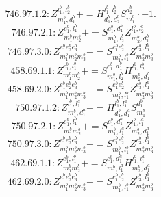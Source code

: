 \documentclass[letterpaper,10pt,fleqn,leqno,onecolumn]{article}
\begin{document}
\begin{equation} \;\;\;\;\;\;  746.97.1.2: Z^{l_{1}^{b},l_{2}^{b}}_{m_{1}^{b},d_{1}^{b}}+=H^{l_{1}^{b},l_{2}^{b}}_{d_{1}^{b},d_{2}^{b}}S^{d_{2}^{b}}_{m_{1}^{b}}\cdot -1. \end{equation}
\begin{equation} \;\;\;\;\;\;  746.97.2.1: Z^{e_{1}^{b},l_{1}^{b}}_{m_{1}^{b}m_{2}^{b}}+=S^{e_{1}^{b},d_{1}^{b}}_{m_{1}^{b},l_{2}^{b}}Z^{l_{1}^{b},l_{2}^{b}}_{m_{2}^{b},d_{1}^{b}} \end{equation}
\begin{equation} \;\;\;\;\;\;  746.97.3.0: Z^{e_{1}^{b}e_{2}^{b}e_{3}^{b}}_{m_{1}^{b}m_{2}^{b}m_{3}^{b}}+=S^{e_{1}^{b}e_{2}^{b}}_{m_{1}^{b},l_{1}^{b}}Z^{e_{3}^{b},l_{1}^{b}}_{m_{2}^{b}m_{3}^{b}} \end{equation}
\begin{equation} \;\;\;\;\;\;  458.69.1.1: Z^{e_{1}^{b},l_{1}^{b}}_{m_{1}^{b}m_{2}^{b}}+=S^{e_{1}^{b},d_{1}^{b}}_{m_{1}^{b},l_{2}^{b}}H^{l_{1}^{b},l_{2}^{b}}_{m_{2}^{b},d_{1}^{b}} \end{equation}
\begin{equation} \;\;\;\;\;\;  458.69.2.0: Z^{e_{1}^{b}e_{2}^{b}e_{3}^{b}}_{m_{1}^{b}m_{2}^{b}m_{3}^{b}}+=S^{e_{1}^{b}e_{2}^{b}}_{m_{1}^{b},l_{1}^{b}}Z^{e_{3}^{b},l_{1}^{b}}_{m_{2}^{b}m_{3}^{b}} \end{equation}
\begin{equation} \;\;\;\;\;\;  750.97.1.2: Z^{l_{1}^{b},l_{1}^{a}}_{m_{1}^{b},d_{1}^{a}}+=H^{l_{1}^{b},l_{1}^{a}}_{d_{1}^{b},d_{1}^{a}}S^{d_{1}^{b}}_{m_{1}^{b}} \end{equation}
\begin{equation} \;\;\;\;\;\;  750.97.2.1: Z^{e_{1}^{b},l_{1}^{b}}_{m_{1}^{b}m_{2}^{b}}+=S^{e_{1}^{b},d_{1}^{a}}_{m_{1}^{b},l_{1}^{a}}Z^{l_{1}^{b},l_{1}^{a}}_{m_{2}^{b},d_{1}^{a}} \end{equation}
\begin{equation} \;\;\;\;\;\;  750.97.3.0: Z^{e_{1}^{b}e_{2}^{b}e_{3}^{b}}_{m_{1}^{b}m_{2}^{b}m_{3}^{b}}+=S^{e_{1}^{b}e_{2}^{b}}_{m_{1}^{b},l_{1}^{b}}Z^{e_{3}^{b},l_{1}^{b}}_{m_{2}^{b}m_{3}^{b}} \end{equation}
\begin{equation} \;\;\;\;\;\;  462.69.1.1: Z^{e_{1}^{b},l_{1}^{b}}_{m_{1}^{b}m_{2}^{b}}+=S^{e_{1}^{b},d_{1}^{a}}_{m_{1}^{b},l_{1}^{a}}H^{l_{1}^{b},l_{1}^{a}}_{m_{2}^{b},d_{1}^{a}} \end{equation}
\begin{equation} \;\;\;\;\;\;  462.69.2.0: Z^{e_{1}^{b}e_{2}^{b}e_{3}^{b}}_{m_{1}^{b}m_{2}^{b}m_{3}^{b}}+=S^{e_{1}^{b}e_{2}^{b}}_{m_{1}^{b},l_{1}^{b}}Z^{e_{3}^{b},l_{1}^{b}}_{m_{2}^{b}m_{3}^{b}} \end{equation}
\end{document}
